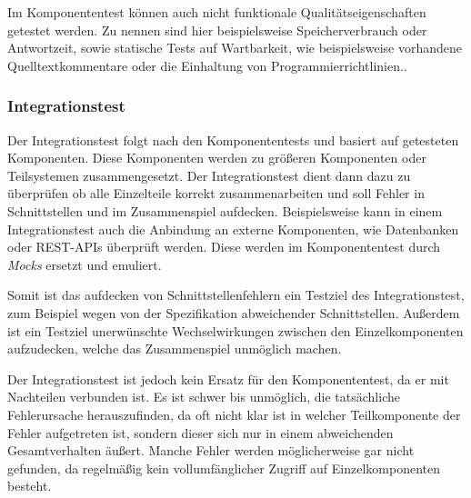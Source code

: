Im Komponententest können auch nicht funktionale Qualitätseigenschaften getestet werden. Zu nennen sind hier beispielsweise Speicherverbrauch oder Antwortzeit, sowie statische Tests auf Wartbarkeit, wie beispielsweise vorhandene Quelltextkommentare oder die Einhaltung von Programmierrichtlinien.\cite[][49\psq]{spillner}.

\subsubsection{Integrationstest}
Der Integrationstest folgt nach den Komponententests und basiert auf getesteten Komponenten. Diese Komponenten werden zu größeren Komponenten oder Teilsystemen zusammengesetzt. Der Integrationstest dient dann dazu zu überprüfen ob alle Einzelteile korrekt zusammenarbeiten und soll Fehler in Schnittstellen und im Zusammenspiel aufdecken. \cite[][52\psq]{spillner} Beispielsweise kann in einem Integrationstest auch die Anbindung an externe Komponenten, wie Datenbanken oder REST-APIs überprüft werden. Diese werden im Komponententest durch \textit{Mocks} ersetzt und emuliert.

Somit ist das aufdecken von Schnittstellenfehlern ein Testziel des Integrationstest, zum Beispiel wegen von der Spezifikation abweichender Schnittstellen. Außerdem ist ein Testziel unerwünschte Wechselwirkungen zwischen den Einzelkomponenten aufzudecken, welche das Zusammenspiel unmöglich machen. \cite[][56]{spillner}

Der Integrationstest ist jedoch kein Ersatz für den Komponententest, da er mit Nachteilen verbunden ist. Es ist schwer bis unmöglich, die tatsächliche Fehlerursache herauszufinden, da oft nicht klar ist in welcher Teilkomponente der Fehler aufgetreten ist, sondern dieser sich nur in einem abweichenden Gesamtverhalten äußert. Manche Fehler werden möglicherweise gar nicht gefunden, da regelmäßig kein vollumfänglicher Zugriff auf Einzelkomponenten besteht.\cite[][57]{spillner}

